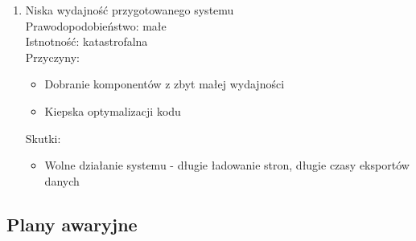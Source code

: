 \documentclass[12pt,a4paper]{article}
\begin{document}
\begin{enumerate}
    \item Niska wydajność przygotowanego systemu\\
    Prawodopodobieństwo: małe\\
    Istnotność: katastrofalna\\
    Przyczyny:
    \begin{itemize}
        \item Dobranie komponentów z zbyt małej wydajności
        \item Kiepska optymalizacji kodu
    \end{itemize}
    Skutki:
    \begin{itemize}
        \item Wolne działanie systemu - długie ładowanie stron, długie czasy eksportów danych
    \end{itemize}
\end{enumerate}


\subsection{Plany awaryjne}
\end{document}

